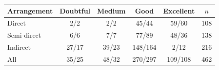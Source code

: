 \begin{tabular}{lccccc}
\toprule
Arrangement & Doubtful & Medium & Good & Excellent & $n$ \\
\midrule
Direct & 2/2 & 2/2 & 45/44 & 59/60 & 108 \\
Semi-direct & 6/6 & 7/7 & 77/89 & 48/36 & 138 \\
Indirect & 27/17 & 39/23 & 148/164 & 2/12 & 216 \\
\midrule
All & 35/25 & 48/32 & 270/297 & 109/108 & 462 \\
\bottomrule
\end{tabular}
